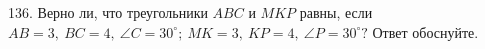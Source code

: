 136. Верно ли, что треугольники $ABC$ и $MKP$ равны, если $AB=3,\ BC=4,\ \angle C=30^\circ;\ MK=3,\ KP=4,\ \angle P=30^\circ?$ Ответ обоснуйте.\\
